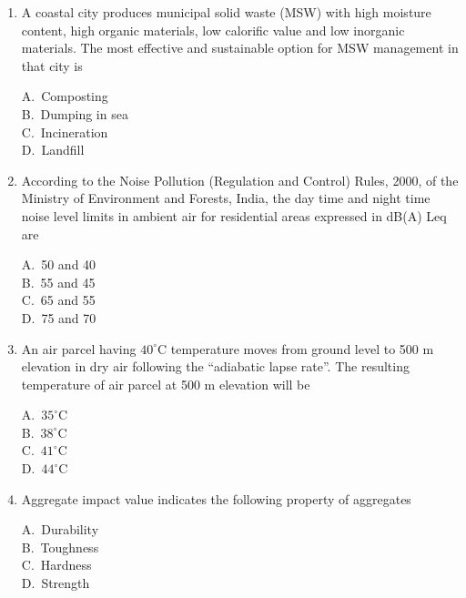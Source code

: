 \documentclass[journal,12pt,onecolumn]{exam}
\theoremstyle{remark}
\begin{document}
\begin{enumerate}
\noindent\item A coastal city produces municipal solid waste (MSW) with high moisture content, high organic materials, low calorific value and low inorganic materials. The most effective and sustainable option for MSW management in that city is
\hfill{}
\begin{multicols}{4}
A.\ Composting \\
B.\ Dumping in sea \\
C.\ Incineration \\
D.\ Landfill
\end{multicols}

\noindent\item According to the Noise Pollution (Regulation and Control) Rules, 2000, of the Ministry of Environment and Forests, India, the day time and night time noise level limits in ambient air for residential areas expressed in dB(A) Leq are
\hfill{}
\begin{multicols}{4}
A.\ 50 and 40 \\
B.\ 55 and 45 \\
C.\ 65 and 55 \\
D.\ 75 and 70
\end{multicols}

\setlength{\parindent}{0pt}
\setlength{\parskip}{0.5cm}


\noindent\item An air parcel having $40^\circ\mathrm{C}$ temperature moves from ground level to 500 m elevation in dry air following the ``adiabatic lapse rate''. The resulting temperature of air parcel at 500 m elevation will be
\hfill{}
\begin{multicols}{4}
A.\ $35^\circ\mathrm{C}$ \\
B.\ $38^\circ\mathrm{C}$ \\
C.\ $41^\circ\mathrm{C}$ \\
D.\ $44^\circ\mathrm{C}$
\end{multicols}

\noindent\item Aggregate impact value indicates the following property of aggregates
\hfill{}
\begin{multicols}{4}
A.\ Durability \\
B.\ Toughness \\
C.\ Hardness \\
D.\ Strength
\end{multicols}


\end{enumerate}
\end{document}

